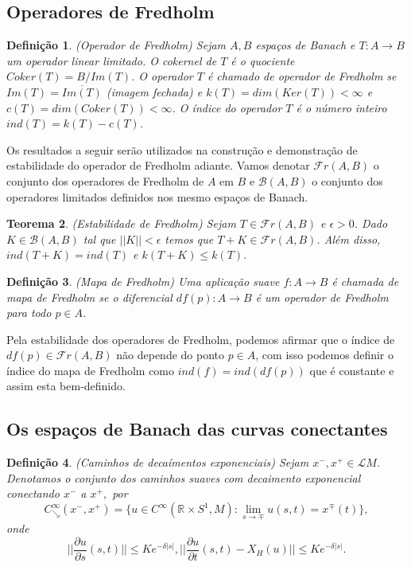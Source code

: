 \documentclass[12pt]{book}
\newtheorem{teorema}{Teorema}[section]
\newtheorem{definicao}[teorema]{Definição}
\newcommand{\aplicaoessuavesreatacirculo}{C^{\infty}(\retacartesianocirculo, M)}
\newcommand{\caminhosdecaimentoexponencial}[2]{C^{\infty}_{\searrow}(#1, #2)}
\newcommand{\caminhosdecaimentoexponencialpadrao}{\caminhosdecaimentoexponencial{x^{-}}{x^{+}}}
\newcommand{\circulo}{S^{1}}
\newcommand{\derivadaparcial}[2]{\frac{\partial #1}{\partial #2}}
\newcommand{\normagrande}[1]{\Big|\Big|#1\Big|\Big|}
\newcommand{\operadoresfredholm}[2]{\mathcal{F}r(#1, #2)}
\newcommand{\operadoreslimitados}[2]{\mathcal{B}(#1, #2)}
\newcommand{\retacartesianocirculo}{\real{} \times \circulo}
\newcommand{\real}[1]{\mathbb{R}^{#1}}
\newcommand{\solucoesperiodicascontrateis}{\mathcal{L}M}
\begin{document}
	\subsection{Operadores de Fredholm}
	\begin{definicao}\label{definicao_oeprador_fredholm}
		(Operador de Fredholm) Sejam $A, B$ espaços de Banach e $T: A\to B$ um operador linear limitado. O cokernel de $T$ é o quociente $Coker(T)=B/Im(T)$. O operador $T$ é chamado de operador de Fredholm se $Im(T)=\overline{Im(T)}$ (imagem fechada) e $k(T) = dim(Ker(T)) < \infty$ e $c(T)=dim(Coker(T)) < \infty$. O índice do operador $T$ é o número inteiro $ind(T) = k(T) - c(T)$.  
	\end{definicao}
	
	Os resultados a seguir serão utilizados na construção e demonstração de estabilidade do operador de Fredholm adiante. Vamos denotar $\operadoresfredholm{A}{B}$ o conjunto dos operadores de Fredholm de $A$ em $B$ e $\operadoreslimitados{A}{B}$ o conjunto dos operadores limitados definidos nos mesmo espaços de Banach.

	\begin{teorema}\label{teorema_estabilidade_fredholm}
		(Estabilidade de Fredholm) Sejam  $T \in \operadoresfredholm{A}{B}$ e $\epsilon>0$. Dado $K \in \operadoreslimitados{A}{B}$ tal que $||K|| < \epsilon$ temos que $T+K \in \operadoresfredholm{A}{B}$. Além disso, $ind(T+K)=ind(T)$ e $k(T+K) \leq k(T)$.
	\end{teorema}
	
	\begin{definicao}
		(Mapa de Fredholm) Uma aplicação suave $f: A \to B$ é chamada de mapa de Fredholm se o diferencial $df(p): A \to B$ é um operador de Fredholm para todo $p \in A$.
	\end{definicao}
	
	
	Pela estabilidade dos operadores de Fredholm, podemos afirmar que o índice de $df(p) \in \operadoresfredholm{A}{B}$ não depende do ponto $p \in A$, com isso podemos definir o índice do mapa de Fredholm como $ind(f)=ind(df(p))$ que é constante e assim esta bem-definido.
	
	\subsection{Os espaços de Banach das curvas conectantes}
	
	\begin{definicao}\label{definicao_caminhos_decaimentos_exponenciais}
		(Caminhos de decaímentos exponenciais) Sejam $x^{-}, x^{+} \in \solucoesperiodicascontrateis$. Denotamos o conjunto dos caminhos suaves com decaimento exponencial conectando $x^{-}$ a $x^{+}, $ por
		$$
		\caminhosdecaimentoexponencialpadrao = \{u \in \aplicaoessuavesreatacirculo: \lim_{s \to \mp} u(s,t) = x^{\mp}(t) \},
		$$
		onde 
		$$
		\normagrande{\derivadaparcial{u}{s}(s,t)} \leq Ke^{-\delta|s|},  \normagrande{\derivadaparcial{u}{t}(s,t) -X_{H}(u)} \leq Ke^{-\delta|s|}.
		$$
	\end{definicao}
	
\end{document}
